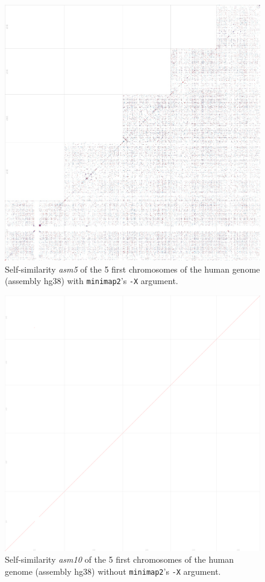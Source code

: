 \documentclass{article}
\begin{document}
\begin{figure}[!h]
	\centering
	\includegraphics[scale=.3]{figs/x_human.jpg}
	\caption{Self-similarity \textit{asm5} of the 5 first chromosomes of the human genome (assembly hg38) with \texttt{minimap2}'s \texttt{-X} argument.
	\label{fig:hg38-X}}
\end{figure}

\begin{figure}[!h]
	\hspace{-1cm}
	\includegraphics[width=1.1\textwidth]{figs/human_10.eps}
	\caption{Self-similarity \textit{asm10} of the 5 first chromosomes of the human genome (assembly hg38) without \texttt{minimap2}'s \texttt{-X} argument.
	\label{fig:hg38-10}}
\end{figure}
\end{document}
